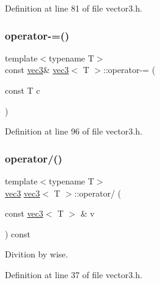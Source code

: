 Definition at line 81 of file vector3.\+h.

\mbox{\label{structvec3_ac7fa0e349317986caa29b4450612f164}} 
\subsubsection{\texorpdfstring{operator-\/=()}{operator-=()}\hspace{0.1cm}{\footnotesize\ttfamily [2/2]}}
{\footnotesize\ttfamily template$<$typename T$>$ \\
const \mbox{\hyperlink{structvec3}{vec3}}\& \mbox{\hyperlink{structvec3}{vec3}}$<$ T $>$\+::operator-\/= (\begin{DoxyParamCaption}\item[{const T}]{c }\end{DoxyParamCaption})\hspace{0.3cm}{\ttfamily [inline]}}



Definition at line 96 of file vector3.\+h.

\mbox{\label{structvec3_ad2f8afc304554e7b5d7331030e8bc91d}} 
\subsubsection{\texorpdfstring{operator/()}{operator/()}\hspace{0.1cm}{\footnotesize\ttfamily [1/2]}}
{\footnotesize\ttfamily template$<$typename T$>$ \\
\mbox{\hyperlink{structvec3}{vec3}} \mbox{\hyperlink{structvec3}{vec3}}$<$ T $>$\+::operator/ (\begin{DoxyParamCaption}\item[{const \mbox{\hyperlink{structvec3}{vec3}}$<$ T $>$ \&}]{v }\end{DoxyParamCaption}) const\hspace{0.3cm}{\ttfamily [inline]}}



Divition by wise. 



Definition at line 37 of file vector3.\+h.

